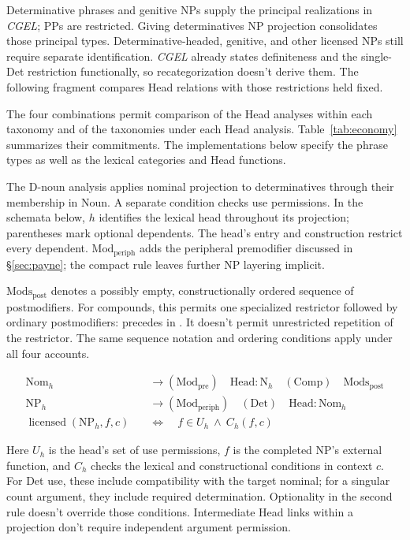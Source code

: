 \documentclass[12pt]{article}
\begin{document}
Determinative phrases and genitive NPs supply the principal realizations in \textit{CGEL}; PPs are restricted. Giving determinatives NP projection consolidates those principal types. Determinative-headed, genitive, and other licensed NPs still require separate identification. \textit{CGEL} already states definiteness and the single-Det restriction functionally, so recategorization doesn't derive them. The following fragment compares Head relations with those restrictions held fixed.

The four combinations permit comparison of the Head analyses within each taxonomy and of the taxonomies under each Head analysis. Table~\ref{tab:economy} summarizes their commitments. The implementations below specify the phrase types as well as the lexical categories and Head functions.

The D-noun analysis applies nominal projection to determinatives through their membership in Noun. A separate condition checks use permissions. In the schemata below, $h$ identifies the lexical head throughout its projection; parentheses mark optional dependents. The head's entry and construction restrict every dependent. $\mathrm{Mod}_{\mathrm{periph}}$ adds the peripheral premodifier discussed in §\ref{sec:payne}; the compact rule leaves further NP layering implicit.

$\mathrm{Mods}_{\mathrm{post}}$ denotes a possibly empty, constructionally ordered sequence of postmodifiers. For compounds, this permits one specialized restrictor followed by ordinary postmodifiers:  precedes  in . It doesn't permit unrestricted repetition of the restrictor. The same sequence notation and ordering conditions apply under all four accounts.

\[
\begin{aligned}
\mathrm{Nom}_{h} &\to (\mathrm{Mod}_{\mathrm{pre}})\quad \mathrm{Head}:\mathrm{N}_{h}\quad (\mathrm{Comp})\quad \mathrm{Mods}_{\mathrm{post}} \\
\mathrm{NP}_{h} &\to (\mathrm{Mod}_{\mathrm{periph}})\quad (\mathrm{Det})\quad \mathrm{Head}:\mathrm{Nom}_{h} \\
\operatorname{licensed}(\mathrm{NP}_{h},f,c)\quad &\Longleftrightarrow\quad f\in U_h\ \land\ C_h(f,c)
\end{aligned}
\]

Here $U_h$ is the head's set of use permissions, $f$ is the completed NP's external function, and $C_h$ checks the lexical and constructional conditions in context $c$. For Det use, these include compatibility with the target nominal; for a singular count argument, they include required determination. Optionality in the second rule doesn't override those conditions. Intermediate Head links within a projection don't require independent argument permission.
\end{document}
